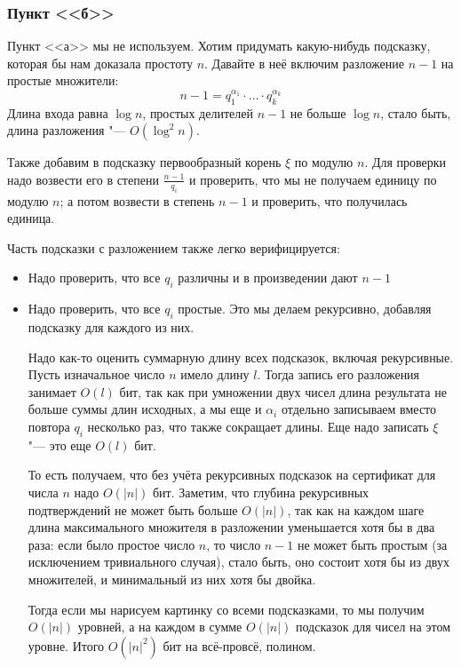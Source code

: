 	\subsubsection{Пункт <<б>>}
		Пункт <<а>> мы не используем.
		Хотим придумать какую-нибудь подсказку, которая бы нам доказала простоту $n$.
		Давайте в неё включим разложение $n-1$ на простые множители:
		\[ n-1 = q_1^{\alpha_1} \cdot \dots \cdot q_k^{\alpha_k} \]
		Длина входа равна $\log n$, простых делителей $n-1$ не больше $\log n$,
		стало быть, длина разложения "--- $O(\log^2 n)$.

		Также добавим в подсказку первообразный корень $\xi$ по модулю $n$.
		Для проверки надо возвести его в степени $\frac{n-1}{q_i}$ и проверить, что
		мы не получаем единицу по модулю $n$;
		а потом возвести в степень $n-1$ и проверить, что получилась единица.
		
		Часть подсказки с разложением также легко верифицируется:
		\begin{itemize}
			\item Надо проверить, что все $q_i$ различны и в произведении дают $n-1$
			\item
				Надо проверить, что все $q_i$ простые.
				Это мы делаем рекурсивно, добавляя подсказку для каждого из них.
				\begin{Rem}
					Надо как-то оценить суммарную длину всех подсказок, включая рекурсивные.
					Пусть изначальное число $n$ имело длину $l$.
					Тогда запись его разложения занимает $O(l)$ бит,
					так как при умножении двух чисел длина результата не больше суммы длин исходных,
					а мы еще и $\alpha_i$ отдельно записываем вместо повтора $q_i$ несколько раз,
					что также сокращает длины.
					Еще надо записать $\xi$ "--- это еще $O(l)$ бит.

					То есть получаем, что без учёта рекурсивных подсказок на сертификат для числа $n$
					надо $O(|n|)$ бит.
					Заметим, что глубина рекурсивных подтверждений не может быть больше $O(|n|)$,
					так как на каждом шаге длина максимального множителя в разложении уменьшается хотя бы
					в два раза: если было простое число $n$, то число $n-1$ не может быть простым (за исключением
					тривиального случая),
					стало быть, оно состоит хотя бы из двух множителей, и минимальный из них хотя бы двойка.

					Тогда если мы нарисуем картинку со всеми подсказками, то мы получим $O(|n|)$ уровней,
					а на каждом в сумме $O(|n|)$ подсказок для чисел на этом уровне.
					Итого $O(|n|^2)$ бит на всё-провсё, полином.
				\end{Rem}
		\end{itemize}

